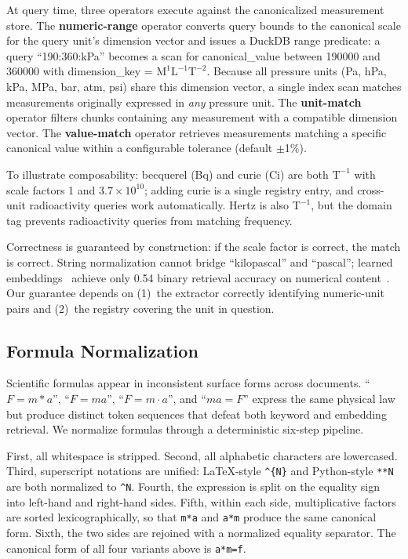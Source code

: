 At query time, three operators execute against the canonicalized measurement store. The \textbf{numeric-range} operator converts query bounds to the canonical scale for the query unit's dimension vector and issues a DuckDB range predicate: a query ``190:360:kPa'' becomes a scan for canonical\_value between 190000 and 360000 with dimension\_key = $\text{M}^1\text{L}^{-1}\text{T}^{-2}$. Because all pressure units (Pa, hPa, kPa, MPa, bar, atm, psi) share this dimension vector, a single index scan matches measurements originally expressed in \emph{any} pressure unit. The \textbf{unit-match} operator filters chunks containing any measurement with a compatible dimension vector. The \textbf{value-match} operator retrieves measurements matching a specific canonical value within a configurable tolerance (default $\pm$1\%).

To illustrate composability: becquerel (Bq) and curie (Ci) are both $\text{T}^{-1}$ with scale factors 1 and $3.7 \times 10^{10}$; adding curie is a single registry entry, and cross-unit radioactivity queries work automatically. Hertz is also $\text{T}^{-1}$, but the domain tag prevents radioactivity queries from matching frequency.

Correctness is guaranteed by construction: if the scale factor is correct, the match is correct. String normalization cannot bridge ``kilopascal'' and ``pascal''; learned embeddings~\cite{cone2026} achieve only 0.54 binary retrieval accuracy on numerical content~\cite{numeracygap2026}. Our guarantee depends on (1)~the extractor correctly identifying numeric-unit pairs and (2)~the registry covering the unit in question.

\subsection{Formula Normalization}

Scientific formulas appear in inconsistent surface forms across documents. ``$F = m \ast a$'', ``$F=ma$'', ``$F = m \cdot a$'', and ``$ma = F$'' express the same physical law but produce distinct token sequences that defeat both keyword and embedding retrieval. We normalize formulas through a deterministic six-step pipeline.

First, all whitespace is stripped. Second, all alphabetic characters are lowercased. Third, superscript notations are unified: LaTeX-style \texttt{\^{}\{N\}} and Python-style \texttt{**N} are both normalized to \texttt{\^{}N}. Fourth, the expression is split on the equality sign into left-hand and right-hand sides. Fifth, within each side, multiplicative factors are sorted lexicographically, so that \texttt{m*a} and \texttt{a*m} produce the same canonical form. Sixth, the two sides are rejoined with a normalized equality separator. The canonical form of all four variants above is \texttt{a*m=f}.

